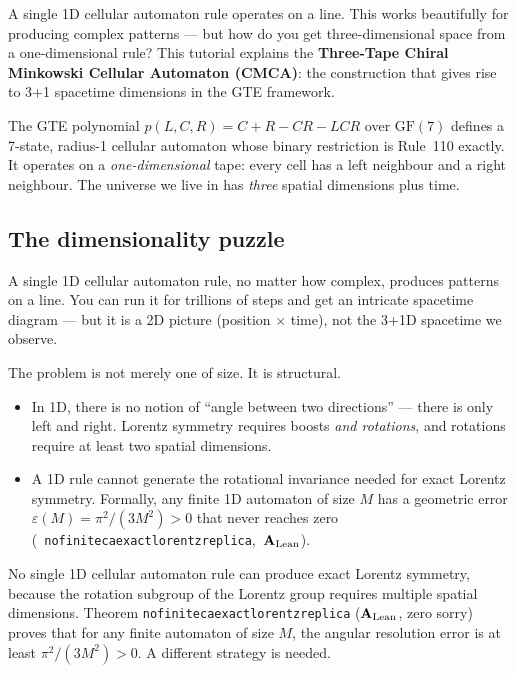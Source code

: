 \documentclass[11pt,a4paper]{article}
\newcommand{\term}[1]{\textbf{#1}}
\newcommand{\lean}[1]{%
  \penalty-100
  \begingroup\def\_{\textunderscore\allowbreak}\texttt{#1}\endgroup}
\newcommand{\CatAL}{\ensuremath{\mathbf{A}_{\rm Lean}}}
\begin{document}
A single 1D cellular automaton rule operates on a line.
This works beautifully for producing complex patterns --- but how do you get
three-dimensional space from a one-dimensional rule?
This tutorial explains the \term{Three-Tape Chiral Minkowski Cellular
Automaton (CMCA)}: the construction that gives rise to 3+1 spacetime
dimensions in the GTE framework.

\medskip
\noindent
The GTE polynomial $p(L,C,R) = C + R - CR - LCR$ over $\mathrm{GF}(7)$
defines a 7-state, radius-1 cellular automaton whose binary restriction
is Rule~110 exactly.  It operates on a \emph{one-dimensional} tape: every
cell has a left neighbour and a right neighbour.  The universe we live in
has \emph{three} spatial dimensions plus time.

\subsection{The dimensionality puzzle}

A single 1D cellular automaton rule, no matter how complex, produces patterns
on a line.  You can run it for trillions of steps and get an intricate
spacetime diagram --- but it is a 2D picture (position $\times$ time), not
the 3+1D spacetime we observe.

The problem is not merely one of size.  It is structural.
\begin{itemize}
  \item In 1D, there is no notion of ``angle between two directions'' ---
        there is only left and right.  Lorentz symmetry requires boosts
        \emph{and rotations}, and rotations require at least two spatial
        dimensions.
  \item A 1D rule cannot generate the rotational invariance needed for
        exact Lorentz symmetry.  Formally, any finite 1D automaton of
        size $M$ has a geometric error $\varepsilon(M) = \pi^2/(3M^2) > 0$
        that never reaches zero \mbox{(\lean{no\_finite\_ca\_exact\_lorentz\_replica},
        \CatAL)}.
\end{itemize}

\begin{tcolorbox}[colback=boxred,colframe=red!50!black,
  title=The fine-angles problem]
No single 1D cellular automaton rule can produce exact Lorentz symmetry,
because the rotation subgroup of the Lorentz group requires multiple spatial
dimensions.  Theorem \lean{no\_finite\_ca\_exact\_lorentz\_replica} (\CatAL,
zero sorry) proves that for any finite automaton of size $M$, the angular
resolution error is at least $\pi^2/(3M^2) > 0$.
A different strategy is needed.
\end{tcolorbox}
\end{document}
